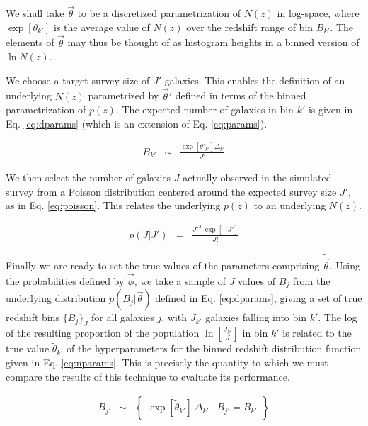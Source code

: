\documentclass[preprint]{aastex}
\begin{document}
We shall take $\vec{\theta}$ to be a discretized parametrization of $N(z)$ in log-space, where $\exp[\theta_{k'}]$ is the average value of $N(z)$ over the redshift range of bin $B_{k'}$.   The elements of $\vec{\theta}$ may thus be thought of as histogram heights in a binned version of $\ln N(z)$.  

We choose a target survey size of $J'$ galaxies.  This enables the definition of an underlying $N(z)$  parametrized by $\vec{\theta}'$ defined in terms of the binned parametrization of $p(z)$.  The expected number of galaxies in bin $k'$ is given in Eq. \ref{eq:dparams} (which is an extension of Eq. \ref{eq:params}).  

\begin{eqnarray}
\label{eq:dparams}
B_{k'} &\sim& \frac{\exp[\theta'_{k'}]\Delta_{k'}}{J'}
\end{eqnarray}

We then select the number of galaxies $J$ actually observed in the simulated survey from a Poisson distribution centered around the expected survey size $J'$, as in Eq. \ref{eq:poisson}.  This relates the underlying $p(z)$ to an underlying $N(z)$.

\begin{eqnarray}
\label{eq:poisson}
p(J|J') &=& \frac{J'^{J}\ \exp[-J']}{J!}
\end{eqnarray}

Finally we are ready to set the true values of the parameters comprising $\tilde{\vec{\theta}}$.  Using the probabilities defined by $\vec{\phi}$, we take a sample of $J$ values of $B_{j}$ from the underlying distribution $p(B_{j}|\vec{\theta})$ defined in Eq. \ref{eq:dparams}, giving a set of true redshift bins $\{B_{j}\}_{J}$ for all galaxies $j$, with $J_{k'}$ galaxies falling into bin $k'$.  The log of the resulting proportion of the population $\ln[\frac{J_{k'}}{J}]$ in bin $k'$ is related to the true value $\tilde{\theta}_{k'}$ of the hyperparameters for the binned redshift distribution function given in Eq. \ref{eq:nparams}.  This is precisely the quantity to which we must compare the results of this technique to evaluate its performance.

\begin{eqnarray}
\label{eq:nparams}
B_{j'} &\sim& \left\{\begin{array}{cc}\exp[\tilde{\theta}_{k'}]\ \Delta_{k'}&B_{j'}=B_{k'}\end{array}\right\}
\end{eqnarray}

\clearpage
\end{document}
